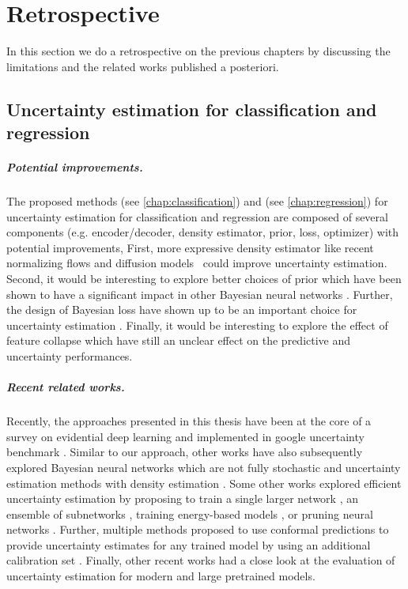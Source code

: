 \chapter{Retrospective}
\label{chap:retrospective}

In this section we do a retrospective on the previous chapters by discussing the limitations and the related works published a posteriori.

\section{Uncertainty estimation for classification and regression} 

\paragraph{Potential improvements.} The proposed methods \PostNetacro{} (see \cref{chap:classification}) and \NatPNacro{} (see \cref{chap:regression}) for uncertainty estimation for classification and regression are composed of several components (e.g. encoder/decoder, density estimator, prior, loss, optimizer) with potential improvements, First, more expressive density estimator like recent normalizing flows \cite{nf-review} and diffusion models \cite{variationaldiffussion2022kingma} could improve uncertainty estimation. Second, it would be interesting to explore better choices of prior which have been shown to have a significant impact in other Bayesian neural networks \cite{bayesposterior2020wenzel, coldaleatoric2020adlam}. Further, the design of Bayesian loss have shown up to be an important choice for uncertainty estimation \cite{bengs2022pitfalls}. Finally, it would be interesting to explore the effect of feature collapse \cite{due} which have still an unclear effect on the predictive and uncertainty performances.

\paragraph{Recent related works.} Recently, the approaches presented in this thesis have been  at the core of a survey on evidential deep learning \cite{survey_evidential_uncertainty} and implemented in google uncertainty benchmark \cite{nado2021uncertainty}. Similar to our approach, other works have also subsequently explored Bayesian neural networks which are not fully stochastic \cite{bnnfullystochastic2022sharma} and uncertainty estimation methods with density estimation \cite{du2022vos, postels2020hiddenuncertainty, uncertainty-generative-classifier}. Some other works explored efficient uncertainty estimation by proposing to train a single larger network \cite{abe2022deep}, an ensemble of subnetworks \cite{mimo-independent-subnetworks}, training energy-based models \cite{ood_ebm}, or pruning neural networks \cite{ayle2022robustness-sparse}. Further, multiple methods proposed to use conformal predictions to provide uncertainty estimates for any trained model by using an additional calibration set \cite{conformal-survey, Park2020PAC}. Finally, other recent works \cite{minderer2021revisiting, tran2022plex} had a close look at the evaluation of uncertainty estimation for modern and large pretrained models.

